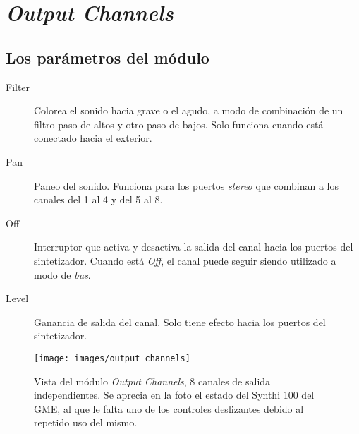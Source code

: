 \section[Interfaz OSC]{\textit{Output Channels}}
\label{sec:output_channels}

\subsection{Los parámetros del módulo}

\begin{description}
	\item[Filter] Colorea el sonido hacia grave o el agudo, a modo de combinación de un filtro paso de altos y otro paso de bajos. Solo funciona cuando está conectado hacia el exterior.
	\item[Pan] Paneo del sonido. Funciona para los puertos \textit{stereo} que combinan a los canales del 1 al 4 y del 5 al 8.
	\item[Off] Interruptor que activa y desactiva la salida del canal hacia los puertos del sintetizador. Cuando está \textit{Off}, el canal puede seguir siendo utilizado a modo de \textit{bus}.
	\item[Level] Ganancia de salida del canal. Solo tiene efecto hacia los puertos del sintetizador.
\end{description}

\begin{figure}
	\centering
	\texttt{[image: images/output\_channels]}
	\caption[\textit{Output Channels}]{Vista del módulo \textit{Output Channels}, 8 canales de salida independientes. Se aprecia en la foto el estado del Synthi 100 del GME, al que le falta uno de los controles deslizantes debido al repetido uso del mismo.}
	\label{fig:output_channels}
\end{figure}